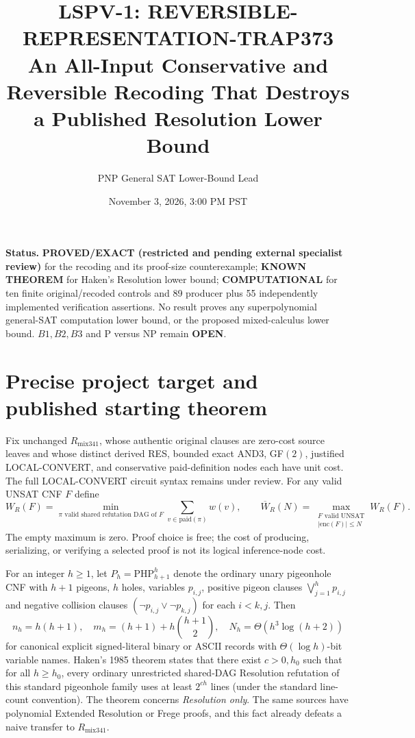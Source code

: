 \documentclass[11pt]{article}
\title{LSPV-1: REVERSIBLE-REPRESENTATION-TRAP373\\[3pt]
An All-Input Conservative and Reversible Recoding That Destroys a Published Resolution Lower Bound}
\author{PNP General SAT Lower-Bound Lead}
\date{November 3, 2026, 3:00 PM PST}
\begin{document}
\maketitle
\noindent\textbf{Status.} \textbf{PROVED/EXACT (restricted and pending external specialist review)} for the recoding and its proof-size counterexample; \textbf{KNOWN THEOREM} for Haken's Resolution lower bound; \textbf{COMPUTATIONAL} for ten finite original/recoded controls and 89 producer plus 55 independently implemented verification assertions. No result proves any superpolynomial general-SAT computation lower bound, or the proposed mixed-calculus lower bound. $B1,B2,B3$ and P versus NP remain \textbf{OPEN}.

\section*{Precise project target and published starting theorem}
Fix unchanged $R_{\mathrm{mix341}}$, whose authentic original clauses are zero-cost source leaves and whose distinct derived RES, bounded exact AND3, GF$(2)$, justified LOCAL-CONVERT, and conservative paid-definition nodes each have unit cost. The full LOCAL-CONVERT circuit syntax remains under review. For any valid UNSAT CNF $F$ define
\[
W_R(F)=\min_{\pi\text{ valid shared refutation DAG of }F}
 \sum_{v\in\mathrm{paid}(\pi)} w(v),\qquad
\overline W_R(N)=\max_{\substack{F\text{ valid UNSAT}\\|\mathrm{enc}(F)|\le N}}W_R(F).
\]
The empty maximum is zero. Proof choice is free; the cost of producing, serializing, or verifying a selected proof is not its logical inference-node cost.

For an integer $h\ge1$, let $P_h=\mathrm{PHP}^{h}_{h+1}$ denote the ordinary unary pigeonhole CNF with $h+1$ pigeons, $h$ holes, variables $p_{i,j}$, positive pigeon clauses $\bigvee_{j=1}^h p_{i,j}$ and negative collision clauses $(\neg p_{i,j}\vee\neg p_{k,j})$ for each $i<k,j$. Then
\[
n_h=h(h+1),\quad m_h=(h+1)+h\binom{h+1}{2},\quad
N_h=\Theta(h^3\log(h+2))
\]
for canonical explicit signed-literal binary or ASCII records with $\Theta(\log h)$-bit variable names. Haken's 1985 theorem states that there exist $c>0,h_0$ such that for all $h\ge h_0$, every ordinary unrestricted shared-DAG Resolution refutation of this standard pigeonhole family uses at least $2^{ch}$ lines (under the standard line-count convention). The theorem concerns \emph{Resolution only}. The same sources have polynomial Extended Resolution or Frege proofs, and this fact already defeats a naive transfer to $R_{\mathrm{mix341}}$.
\end{document}
